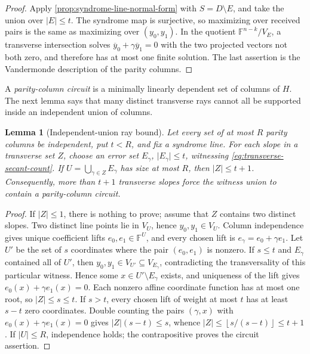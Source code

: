 \documentclass[11pt,a4paper]{amsart}
\numberwithin{equation}{section}
\newtheorem{lemma}[lemma]{Lemma}
\theoremstyle{remark}
\newcommand{\F}{\mathbb F}
\newcommand{\abs}[1]{\lvert #1\rvert}
\newcommand{\floor}[1]{\left\lfloor #1\right\rfloor}
\begin{document}
\begin{proof}
Apply \cref{prop:syndrome-line-normal-form} with \(S=D\setminus E\), and
take the union over \(\abs E\le t\).  The syndrome map is surjective, so
maximizing over received pairs is the same as maximizing over
\((y_0,y_1)\).  In the quotient \(\F^{n-k}/V_E\), a transverse
intersection solves
\(\overline y_0+\gamma\overline y_1=0\) with the two projected vectors
not both zero, and therefore has at most one finite solution.  The last
assertion is the Vandermonde description of the parity columns.
\end{proof}

A \emph{parity-column circuit} is a minimally linearly dependent set of
columns of \(H\).  The next lemma says that many distinct transverse rays
cannot all be supported inside an independent union of columns.

\begin{lemma}[Independent-union ray bound]
\label{lem:independent-union-rays}
Let every set of at most \(R\) parity columns be independent, put
\(t<R\), and fix a syndrome line.  For each slope in a transverse set
\(Z\), choose an error set \(E_\gamma\), \(\abs{E_\gamma}\le t\),
witnessing \eqref{eq:transverse-secant-count}.  If
\(U=\bigcup_{\gamma\in Z}E_\gamma\) has size at most \(R\), then
\(\abs Z\le t+1\).  Consequently, more than \(t+1\) transverse slopes
force the witness union to contain a parity-column circuit.
\end{lemma}

\begin{proof}
If \(\abs Z\le1\), there is nothing to prove; assume that \(Z\) contains
two distinct slopes.  Two distinct line points lie in \(V_U\), hence
\(y_0,y_1\in V_U\).
Column independence gives unique coefficient lifts
\(e_0,e_1\in\F^U\), and every chosen lift is
\(e_\gamma=e_0+\gamma e_1\).  Let \(U'\) be the set of \(s\) coordinates
where the pair \((e_0,e_1)\) is nonzero.  If \(s\le t\) and
\(E_\gamma\) contained all of \(U'\), then
\(y_0,y_1\in V_{U'}\subseteq V_{E_\gamma}\), contradicting the
transversality of this particular witness.  Hence some
\(x\in U'\setminus E_\gamma\) exists, and uniqueness of the lift gives
\(e_0(x)+\gamma e_1(x)=0\).  Each nonzero affine coordinate function has
at most one root, so \(\abs Z\le s\le t\).  If \(s>t\), every chosen lift of
weight at most \(t\) has at least \(s-t\) zero coordinates.  Double
counting the pairs \((\gamma,x)\) with
\(e_0(x)+\gamma e_1(x)=0\) gives
\(\abs Z(s-t)\le s\), whence
\(\abs Z\le\floor{s/(s-t)}\le t+1\).  If \(\abs U\le R\), independence
holds; the contrapositive proves the circuit assertion.
\end{proof}
\end{document}
